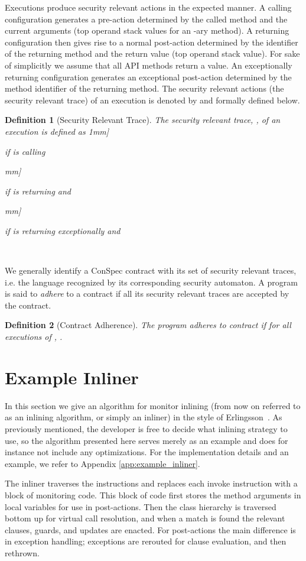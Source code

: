 \documentclass[10pt,twocolumn]{article}
\newtheorem{definition}{Definition}
\begin{document}
Executions produce security relevant actions in the expected manner.
A calling configuration generates a pre-action determined 
by the called method and the current arguments (top  operand stack 
values for an -ary method). A returning configuration then gives 
rise to a normal post-action determined by the identifier of the 
returning method and the return value (top operand stack value). 
For sake of simplicitly we assume that all API methods return a value. 
An exceptionally returning configuration generates an exceptional 
post-action determined by the method identifier of the returning method. 
The security relevant actions (the security relevant trace) of an 
execution  is denoted by  and formally defined below.

\begin{definition}[Security Relevant Trace] The security relevant trace, 
, of an execution  is defined as
1mm]
    \hspace{4mm} \parbox{5cm}{if  is calling } \1mm]
    \hspace{4mm} \parbox{5cm}{if  is returning  and }\1mm]
    \hspace{4mm} \parbox{5cm}{if  is returning exceptionally and }\
\end{definition}

We generally identify a ConSpec contract with its set of security relevant
traces, i.e. the language recognized by its corresponding security automaton.
A program is said to \emph{adhere} to a contract if all its security 
relevant traces are accepted by the contract.
\begin{definition}[Contract Adherence]
The program  adheres to contract  if for all 
executions  of , .
\end{definition}

\section{Example Inliner}\label{sect:inlining}
In this section we give an algorithm for monitor inlining (from now on referred to as an inlining algorithm, or simply an inliner) in the style of Erlingsson~\cite{ErlSch00}. As previously mentioned, the developer is free to decide what inlining strategy to use, so the algorithm presented here serves merely as an example and does for instance not include any optimizations. For the implementation details and an example, we refer to Appendix \ref{app:example_inliner}.

The inliner traverses the instructions and replaces each invoke instruction with a block of monitoring code. This block of code first stores the method arguments in local variables for use in post-actions. Then the class hierarchy is traversed bottom up for virtual call resolution, and when a match is found the relevant clauses, guards, and updates are enacted. For post-actions the main difference is in exception handling; exceptions are rerouted for clause evaluation, and then rethrown.
\end{document}

